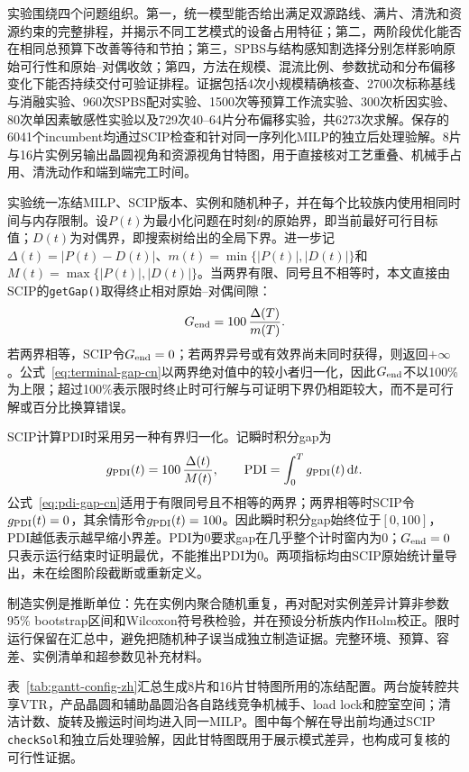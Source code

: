 \documentclass[final,5p,times,twocolumn]{elsarticle}
\newcommand{\pdi}{\mathrm{PDI}}
\begin{document}
实验围绕四个问题组织。第一，统一模型能否给出满足双源路线、满片、清洗和资源约束的完整排程，并揭示不同工艺模式的设备占用特征；第二，两阶段优化能否在相同总预算下改善等待和节拍；第三，SPBS与结构感知割选择分别怎样影响原始可行性和原始--对偶收敛；第四，方法在规模、混流比例、参数扰动和分布偏移变化下能否持续交付可验证排程。证据包括4次小规模精确核查、2700次标称基线与消融实验、960次SPBS配对实验、1500次等预算工作流实验、300次析因实验、80次单因素敏感性实验以及729次40--64片分布偏移实验，共6273次求解。保存的6041个incumbent均通过SCIP检查和针对同一序列化MILP的独立后处理验解。8片与16片实例另输出晶圆视角和资源视角甘特图，用于直接核对工艺重叠、机械手占用、清洗动作和端到端完工时间。

实验统一冻结MILP、SCIP版本、实例和随机种子，并在每个比较族内使用相同时间与内存限制。设$P(t)$为最小化问题在时刻$t$的原始界，即当前最好可行目标值；$D(t)$为对偶界，即搜索树给出的全局下界。进一步记$\Delta(t)=|P(t)-D(t)|$、$m(t)=\min\{|P(t)|,|D(t)|\}$和$M(t)=\max\{|P(t)|,|D(t)|\}$。当两界有限、同号且不相等时，本文直接由SCIP的\texttt{getGap()}取得终止相对原始--对偶间隙：
\begin{equation}
G_{\rm end}=100\,\frac{\Delta(T)}{m(T)}.
\label{eq:terminal-gap-cn}
\end{equation}
若两界相等，SCIP令$G_{\rm end}=0$；若两界异号或有效界尚未同时获得，则返回$+\infty$。公式~\eqref{eq:terminal-gap-cn}以两界绝对值中的较小者归一化，因此$G_{\rm end}$不以100\%为上限；超过100\%表示限时终止时可行解与可证明下界仍相距较大，而不是可行解或百分比换算错误。

SCIP计算PDI时采用另一种有界归一化。记瞬时积分gap为
\begin{equation}
g_{\rm PDI}(t)=100\,\frac{\Delta(t)}{M(t)},\qquad
\pdi=\int_0^T g_{\rm PDI}(t)\,\mathrm dt.
\label{eq:pdi-gap-cn}
\end{equation}
公式~\eqref{eq:pdi-gap-cn}适用于有限同号且不相等的两界；两界相等时SCIP令$g_{\rm PDI}(t)=0$，其余情形令$g_{\rm PDI}(t)=100$。因此瞬时积分gap始终位于$[0,100]$，PDI越低表示越早缩小界差。PDI为0要求gap在几乎整个计时窗内为0；$G_{\rm end}=0$只表示运行结束时证明最优，不能推出PDI为0。两项指标均由SCIP原始统计量导出，未在绘图阶段截断或重新定义\citep{achterberg2009scip,bestuzheva2023scip}。

制造实例是推断单位：先在实例内聚合随机重复，再对配对实例差异计算非参数95\% bootstrap区间和Wilcoxon符号秩检验，并在预设分析族内作Holm校正\citep{gleixner2021miplib}。限时运行保留在汇总中，避免把随机种子误当成独立制造证据。完整环境、预算、容差、实例清单和超参数见补充材料。

表~\ref{tab:gantt-config-zh}汇总生成8片和16片甘特图所用的冻结配置。两台旋转腔共享VTR，产品晶圆和辅助晶圆沿各自路线竞争机械手、load lock和腔室空间；清洁计数、旋转及搬运时间均进入同一MILP。图中每个解在导出前均通过SCIP \texttt{checkSol}和独立后处理验解，因此甘特图既用于展示模式差异，也构成可复核的可行性证据。
\end{document}
